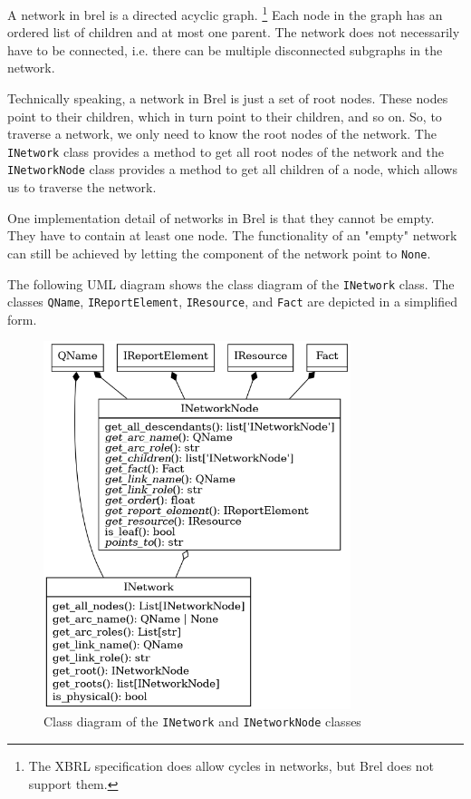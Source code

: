 A network in brel is a directed acyclic graph.
\footnote{The XBRL specification does allow cycles in networks, but Brel does not support them.}
Each node in the graph has an ordered list of children and at most one parent.
The network does not necessarily have to be connected, i.e. there can be multiple disconnected subgraphs in the network.

Technically speaking, a network in Brel is just a set of root nodes.
These nodes point to their children, which in turn point to their children, and so on.
So, to traverse a network, we only need to know the root nodes of the network.
The \texttt{INetwork} class provides a method to get all root nodes of the network
and the \texttt{INetworkNode} class provides a method to get all children of a node,
which allows us to traverse the network.

One implementation detail of networks in Brel is that they cannot be empty.
They have to contain at least one node.
The functionality of an "empty" network can still be achieved by letting the component of the network point to \texttt{None}.

The following UML diagram shows the class diagram of the \texttt{INetwork} class. 
The classes \texttt{QName}, \texttt{IReportElement}, \texttt{IResource}, and \texttt{Fact} are depicted in a simplified form.

\begin{figure}[H]
    \caption{Class diagram of the \texttt{INetwork} and \texttt{INetworkNode} classes}
    \label{fig:inetwork_class_diagram}
    \includegraphics[width=0.8\textwidth]{images/i_networks_uml.png}
\end{figure}

